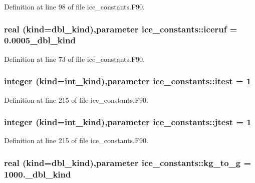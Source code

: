 Definition at line 98 of file ice\_\-constants.F90.\hypertarget{namespaceice__constants_ac29badea7fe3d80ca6d1de8376b17836}{
\subsubsection[{iceruf}]{\setlength{\rightskip}{0pt plus 5cm}real (kind=dbl\_\-kind),parameter {\bf ice\_\-constants::iceruf} = 0.0005\_\-dbl\_\-kind}}
\label{namespaceice__constants_ac29badea7fe3d80ca6d1de8376b17836}


Definition at line 73 of file ice\_\-constants.F90.\hypertarget{namespaceice__constants_af78b1568368337f01e89d12111f68e2e}{
\subsubsection[{itest}]{\setlength{\rightskip}{0pt plus 5cm}integer (kind=int\_\-kind),parameter {\bf ice\_\-constants::itest} = 1}}
\label{namespaceice__constants_af78b1568368337f01e89d12111f68e2e}


Definition at line 215 of file ice\_\-constants.F90.\hypertarget{namespaceice__constants_ac7e42098d3809e659df8da6e3fe54368}{
\subsubsection[{jtest}]{\setlength{\rightskip}{0pt plus 5cm}integer (kind=int\_\-kind),parameter {\bf ice\_\-constants::jtest} = 1}}
\label{namespaceice__constants_ac7e42098d3809e659df8da6e3fe54368}


Definition at line 215 of file ice\_\-constants.F90.\hypertarget{namespaceice__constants_a8521dc2c82ea56e569469e82ad4780e2}{
\subsubsection[{kg\_\-to\_\-g}]{\setlength{\rightskip}{0pt plus 5cm}real (kind=dbl\_\-kind),parameter {\bf ice\_\-constants::kg\_\-to\_\-g} = 1000.\_\-dbl\_\-kind}}
\label{namespaceice__constants_a8521dc2c82ea56e569469e82ad4780e2}


